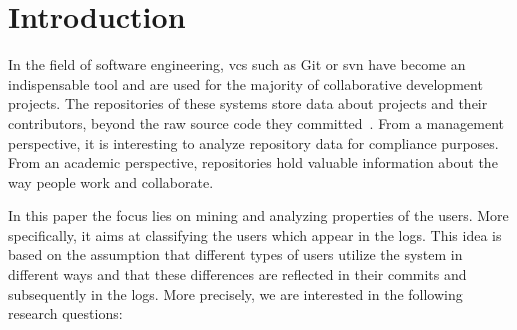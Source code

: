 \section{Introduction}\label{sec:introduction}

In the field of software engineering, \gls{vcs} such as Git or \gls{svn} have become an indispensable tool and are used for the majority of collaborative development projects. The repositories of these systems store data about projects and their contributors, beyond the raw source code they committed~\cite{Yu.LiguoRamaswamy.2007}.
From a management perspective, it is interesting to analyze repository data for compliance purposes. From an academic perspective, repositories hold valuable information about the way people work and collaborate.


In this paper the focus lies on mining and analyzing properties of the users. More specifically, it aims at classifying the users which appear in the logs. This idea is based on the assumption that different types of users utilize the system in different ways and that these differences are reflected in their commits and subsequently in the logs. More precisely, we are interested in the following research questions:



